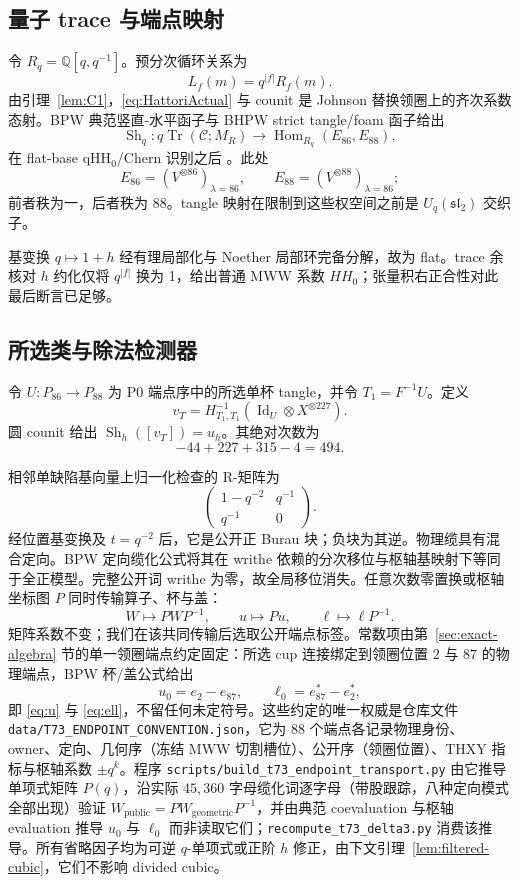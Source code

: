 \documentclass[11pt]{amsart}
\theoremstyle{definition}
\theoremstyle{remark}
\newcommand{\Q}{\mathbb{Q}}
\begin{document}
\subsection{量子 trace 与端点映射}

令 $R_q=\Q[q,q^{-1}]$。预分次循环关系为
\[
L_f(m)=q^{|f|}R_f(m).
\]
由引理~\ref{lem:C1}，\eqref{eq:HattoriActual} 与 counit 是 Johnson 替换领圈上的齐次系数态射。BPW 典范竖直-水平函子与 BHPW strict tangle/foam 函子给出
\begin{equation}\label{eq:actualShadow}
\operatorname{Sh}_q:q\operatorname{Tr}(\mathcal C;M_R)
\longrightarrow\operatorname{Hom}_{R_q}(E_{86},E_{88}),
\end{equation}
在 flat-base qHH$_0$/Chern 识别之后
\cite{BeliakovaPutyraWehrli2019,BeliakovaHogancampPutyraWehrli2023}。此处
\[
E_{86}=(V^{\otimes86})_{\lambda=86},\qquad
E_{88}=(V^{\otimes88})_{\lambda=86};
\]
前者秩为一，后者秩为 88。tangle 映射在限制到这些权空间之前是 $U_q(\mathfrak{sl}_2)$ 交织子。

基变换 $q\mapsto1+h$ 经有理局部化与 Noether 局部环完备分解，故为 flat。trace 余核对 $h$ 约化仅将 $q^{|f|}$ 换为 1，给出普通 MWW 系数 $HH_0$；张量积右正合性对此最后断言已足够。

\subsection{所选类与除法检测器}

令 $U:P_{86}\to P_{88}$ 为 P0 端点序中的所选单杯 tangle，并令 $T_1=F^{-1}U$。定义
\[
v_T=H_{T_1,T_1}^{-1}
  (\operatorname{Id}_U\otimes X^{\otimes227}).
\]
圆 counit 给出
$\operatorname{Sh}_h([v_T])=u_h$。其绝对次数为
\[
-44+227+315-4=494.
\]

相邻单缺陷基向量上归一化检查的 R-矩阵为
\[
\begin{pmatrix}1-q^{-2}&q^{-1}\\q^{-1}&0\end{pmatrix}.
\]
经位置基变换及 $t=q^{-2}$ 后，它是公开正 Burau 块；负块为其逆。物理缆具有混合定向。BPW 定向缆化公式将其在 writhe 依赖的分次移位与枢轴基映射下等同于全正模型。完整公开词 writhe 为零，故全局移位消失。任意次数零置换或枢轴坐标图 $P$ 同时传输算子、杯与盖：
\[
W\mapsto PWP^{-1},\qquad u\mapsto Pu,\qquad
\ell\mapsto\ell P^{-1}.
\]
矩阵系数不变；我们在该共同传输后选取公开端点标签。常数项由第~\ref{sec:exact-algebra} 节的单一领圈端点约定固定：所选 cup 连接绑定到领圈位置 $2$ 与 $87$ 的物理端点，BPW 杯/盖公式给出
\[
u_0=e_2-e_{87},\qquad
\ell_0=e_{87}^*-e_2^*,
\]
即 \eqref{eq:u} 与 \eqref{eq:ell}，不留任何未定符号。这些约定的唯一权威是仓库文件 \texttt{data/T73\_ENDPOINT\_CONVENTION.json}，它为 $88$ 个端点各记录物理身份、owner、定向、几何序（冻结 MWW 切割槽位）、公开序（领圈位置）、THXY 指标与枢轴系数 $\pm q^k$。程序 \texttt{scripts/build\_t73\_endpoint\_transport.py} 由它推导单项式矩阵 $P(q)$，沿实际 $45{,}360$ 字母缆化词逐字母（带股跟踪，八种定向模式全部出现）验证 $W_{\mathrm{public}}=PW_{\mathrm{geometric}}P^{-1}$，并由典范 coevaluation 与枢轴 evaluation 推导 $u_0$ 与 $\ell_0$ 而非读取它们；\texttt{recompute\_t73\_delta3.py} 消费该推导。所有省略因子均为可逆 $q$-单项式或正阶 $h$ 修正，由下文引理~\ref{lem:filtered-cubic}，它们不影响 divided cubic。
\end{document}
